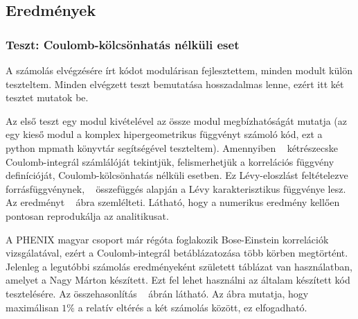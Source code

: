 \documentclass[11pt,a4paper]{article}
\numberwithin{equation}{subsection}
\numberwithin{figure}{section}
\begin{document}
\subsection{Eredmények}

\subsubsection{Teszt: Coulomb-kölcsönhatás nélküli eset}

A számolás elvégzésére írt kódot modulárisan fejlesztettem, minden modult külön teszteltem. Minden elvégzett teszt bemutatása hosszadalmas lenne, ezért itt két tesztet mutatok be. 

Az első teszt egy modul kivételével az össze modul megbízhatóságát mutatja (az egy kieső modul a komplex hipergeometrikus függvényt számoló kód, ezt a python mpmath könyvtár segítségével teszteltem). Amennyiben ~ kétrészecske Coulomb-integrál számlálóját tekintjük, felismerhetjük a korrelációs függvény definícióját, Coulomb-kölcsönhatás nélküli esetben. Ez Lévy-eloszlást feltételezve forrásfüggvénynek, ~ összefüggés alapján a Lévy karakterisztikus függvénye lesz. Az eredményt ~ ábra szemlélteti. Látható, hogy a numerikus eredmény kellően pontosan reprodukálja az analitikusat.

A PHENIX magyar csoport már régóta foglakozik Bose-Einstein korrelációk vizsgálatával, ezért a Coulomb-integrál betáblázatozása több körben megtörtént. Jelenleg a legutóbbi számolás eredményeként született táblázat van használatban, amelyet a Nagy Márton készített. Ezt fel lehet használni az általam készített kód tesztelésére. Az összehasonlítás ~ ábrán látható. Az ábra mutatja, hogy maximálisan $1\%$ a relatív eltérés a két számolás között, ez elfogadható.
\end{document}
